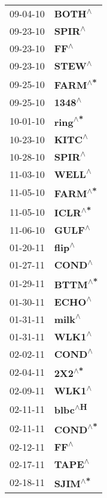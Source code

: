 \begin{supertabular}{p{0.08\textwidth}p{0.2\textwidth}}
 09-04-10 &    \textbf{BOTH\textsuperscript{$\wedge$}} \\
 09-23-10 &    \textbf{SPIR\textsuperscript{$\wedge$}} \\
 09-23-10 &      \textbf{FF\textsuperscript{$\wedge$}} \\
 09-23-10 &    \textbf{STEW\textsuperscript{$\wedge$}} \\
 09-25-10 &   \textbf{FARM\textsuperscript{$\wedge$*}} \\
 09-25-10 &    \textbf{1348\textsuperscript{$\wedge$}} \\
 10-01-10 &   \textbf{ring\textsuperscript{$\wedge$*}} \\
 10-23-10 &    \textbf{KITC\textsuperscript{$\wedge$}} \\
 10-28-10 &    \textbf{SPIR\textsuperscript{$\wedge$}} \\
 11-03-10 &    \textbf{WELL\textsuperscript{$\wedge$}} \\
 11-05-10 &   \textbf{FARM\textsuperscript{$\wedge$*}} \\
 11-05-10 &   \textbf{ICLR\textsuperscript{$\wedge$*}} \\
 11-06-10 &    \textbf{GULF\textsuperscript{$\wedge$}} \\
 01-20-11 &    \textbf{flip\textsuperscript{$\wedge$}} \\
 01-27-11 &    \textbf{COND\textsuperscript{$\wedge$}} \\
 01-29-11 &   \textbf{BTTM\textsuperscript{$\wedge$*}} \\
 01-30-11 &    \textbf{ECHO\textsuperscript{$\wedge$}} \\
 01-31-11 &    \textbf{milk\textsuperscript{$\wedge$}} \\
 01-31-11 &    \textbf{WLK1\textsuperscript{$\wedge$}} \\
 02-02-11 &    \textbf{COND\textsuperscript{$\wedge$}} \\
 02-04-11 &    \textbf{2X2\textsuperscript{$\wedge$*}} \\
 02-09-11 &    \textbf{WLK1\textsuperscript{$\wedge$}} \\
 02-11-11 &   \textbf{blbc\textsuperscript{$\wedge$H}} \\
 02-11-11 &   \textbf{COND\textsuperscript{$\wedge$*}} \\
 02-12-11 &      \textbf{FF\textsuperscript{$\wedge$}} \\
 02-17-11 &    \textbf{TAPE\textsuperscript{$\wedge$}} \\
 02-18-11 &   \textbf{SJIM\textsuperscript{$\wedge$*}} \\

\end{supertabular}
